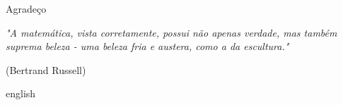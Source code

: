 \documentclass[
	12pt,				%
	openright,			%
	oneside,			%
	a4paper,			%
	english,			%
	french,				%
	spanish,			%
	brazil				%
	]{abntex2}
\begin{document}
\begin{agradecimentos}
Agradeço 

\end{agradecimentos}

\newpage
\begin{epigrafe}
   \vspace*{\fill}
	\begin{flushright}
		\textit{"A matemática, vista corretamente, possui não 
  apenas verdade, mas também suprema beleza - uma beleza fria 
  e austera, como a da escultura."}

    (Bertrand Russell)
	\end{flushright}
\end{epigrafe}


\setlength{\absparsep}{18pt} %
\begin{resumo}

\end{resumo}

\begin{resumo}[Abstract]
\begin{otherlanguage*}{english}

\end{otherlanguage*}
\end{resumo}

\cleardoublepage

\tableofcontents*
\cleardoublepage








\appendix


\postextual

\printbibliography

\printindex
\end{document}
